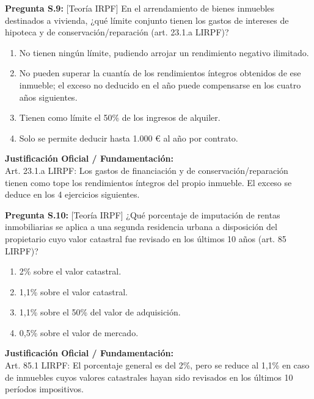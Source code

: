 \documentclass[11pt,a4paper,openany]{article}
\begin{document}
\noindent\textbf{\sffamily Pregunta S.9:} [Teoría IRPF] En el arrendamiento de bienes inmuebles destinados a vivienda, ¿qué límite conjunto tienen los gastos de intereses de hipoteca y de conservación/reparación (art. 23.1.a LIRPF)?\\[0.15cm]
\begin{enumerate}[label=\textbf{\alph*)},leftmargin=1.8em,itemsep=1.5pt,topsep=2pt,partopsep=0pt,parsep=0pt]
    \item No tienen ningún límite, pudiendo arrojar un rendimiento negativo ilimitado.
    \item No pueden superar la cuantía de los rendimientos íntegros obtenidos de ese inmueble; el exceso no deducido en el año puede compensarse en los cuatro años siguientes.
    \item Tienen como límite el 50\% de los ingresos de alquiler.
    \item Solo se permite deducir hasta 1.000 \euro{} al año por contrato.
\end{enumerate}
\begin{solucionBox}
\textbf{Justificación Oficial / Fundamentación:}\\[0.1cm]
Art. 23.1.a LIRPF: Los gastos de financiación y de conservación/reparación tienen como tope los rendimientos íntegros del propio inmueble. El exceso se deduce en los 4 ejercicios siguientes.
\end{solucionBox}
\vspace{0.35cm}

\noindent\textbf{\sffamily Pregunta S.10:} [Teoría IRPF] ¿Qué porcentaje de imputación de rentas inmobiliarias se aplica a una segunda residencia urbana a disposición del propietario cuyo valor catastral fue revisado en los últimos 10 años (art. 85 LIRPF)?\\[0.15cm]
\begin{enumerate}[label=\textbf{\alph*)},leftmargin=1.8em,itemsep=1.5pt,topsep=2pt,partopsep=0pt,parsep=0pt]
    \item 2\% sobre el valor catastral.
    \item 1,1\% sobre el valor catastral.
    \item 1,1\% sobre el 50\% del valor de adquisición.
    \item 0,5\% sobre el valor de mercado.
\end{enumerate}
\begin{solucionBox}
\textbf{Justificación Oficial / Fundamentación:}\\[0.1cm]
Art. 85.1 LIRPF: El porcentaje general es del 2\%, pero se reduce al 1,1\% en caso de inmuebles cuyos valores catastrales hayan sido revisados en los últimos 10 períodos impositivos.
\end{solucionBox}
\vspace{0.35cm}
\end{document}

